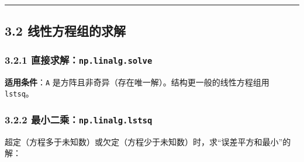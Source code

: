 \begin{center}\rule{0.5\linewidth}{0.5pt}\end{center}

\subsection{3.2
线性方程组的求解}\label{ux7ebfux6027ux65b9ux7a0bux7ec4ux7684ux6c42ux89e3}

\subsubsection{\texorpdfstring{3.2.1
直接求解：\texttt{np.linalg.solve}}{3.2.1 直接求解：np.linalg.solve}}\label{ux76f4ux63a5ux6c42ux89e3np.linalg.solve}

\begin{Shaded}
\begin{Highlighting}[]
\OperatorTok{=}\NormalTok{ np.array([[}\NormalTok{, }\NormalTok{], [}\NormalTok{, }\NormalTok{]])   }
\OperatorTok{=}\NormalTok{ np.array([}\NormalTok{, }\NormalTok{])             }
\OperatorTok{=}
\CommentTok{\# [2. 3.]}
\end{Highlighting}
\end{Shaded}

\textbf{适用条件}：\texttt{A}
是方阵且非奇异（存在唯一解）。结构更一般的线性方程组用 \texttt{lstsq}。

\subsubsection{\texorpdfstring{3.2.2
最小二乘：\texttt{np.linalg.lstsq}}{3.2.2 最小二乘：np.linalg.lstsq}}\label{ux6700ux5c0fux4e8cux4e58np.linalg.lstsq}

超定（方程多于未知数）或欠定（方程少于未知数）时，求``误差平方和最小''的解：

\begin{Shaded}
\begin{Highlighting}[]
\OperatorTok{=}\NormalTok{ np.array([[}\NormalTok{, }\NormalTok{], [}\NormalTok{, }\NormalTok{], [}\NormalTok{, }\NormalTok{], [}\NormalTok{, }\NormalTok{]])}
\OperatorTok{=}\NormalTok{ np.array([}\NormalTok{, }\NormalTok{, }\NormalTok{, }\NormalTok{])}
\OperatorTok{=}\OperatorTok{=}\NormalTok{)}
\end{Highlighting}
\end{Shaded}

